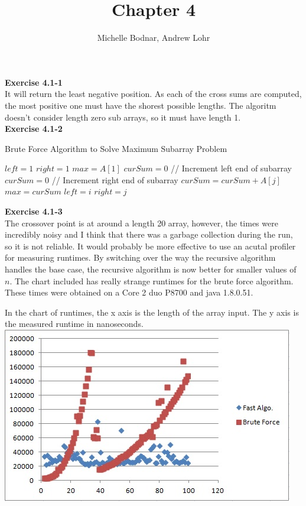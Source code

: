 \documentclass{article}
\title{Chapter 4}
\author{Michelle Bodnar, Andrew Lohr}
\begin{document}
\maketitle

\noindent\textbf{Exercise 4.1-1}\\

It will return the least negative position. As each of the cross sums are computed, the most positive one must have the shorest possible lengths. The algoritm doesn't consider length zero sub arrays, so it must have length 1.\\

\noindent\textbf{Exercise 4.1-2}\\

\begin{algorithm}
\caption{Brute Force Algorithm to Solve Maximum Subarray Problem}
\begin{algorithmic}
\State $left = 1$
\State $right = 1$
\State $max = A[1]$
\State $curSum = 0$
 // Increment left end of subarray
	\State $curSum = 0$
	 // Increment right end of subarray
		\State $curSum = curSum + A[j]$
			\State $max = curSum$
			\State $left = i$
			\State $right = j$
		\EndIf
	\EndFor
\EndFor
\end{algorithmic}
\end{algorithm}

\noindent\textbf{Exercise 4.1-3}\\
The crossover point is at around a length 20 array, however, the times were incredibly noisy and I think that there was a garbage collection during the run, so it is not reliable. It would probably be more effective to use an acutal profiler for measuring runtimes. By switching over the way the recursive algorithm handles the base case, the recursive algorithm is now better for smaller values of $n$. The chart included has really strange runtimes for the brute force algorithm. These times were obtained on a Core 2 duo P8700 and java 1.8.0.51.

In the chart of runtimes, the x axis is the length of the array input. The y axis is the measured runtime in nanoseconds.\\

\includegraphics{4(1)}
\end{document}
